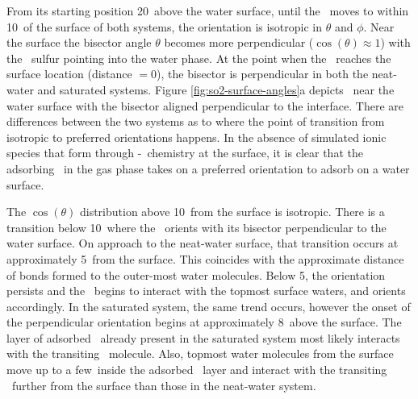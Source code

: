 	From its starting position 20\angs~above the water surface, until the \suldiox~moves to within 10\angs~of the surface of both systems, the orientation is isotropic in $\theta$ and $\phi$. Near the surface the bisector angle $\theta$ becomes more perpendicular ($\cos(\theta)\approx1$) with the \suldiox~sulfur pointing into the water phase. At the point when the \suldiox~reaches the surface location (distance $=0$\angs), the bisector is perpendicular in both the neat-water and saturated systems. Figure \ref{fig:so2-surface-angles}a depicts \suldiox~near the water surface with the bisector aligned perpendicular to the interface. There are differences between the two systems as to where the point of transition from isotropic to preferred orientations happens. In the absence of simulated ionic species that form through \suldiox-\wat~chemistry at the surface, it is clear that the adsorbing \suldiox~in the gas phase takes on a preferred orientation to adsorb on a water surface.
 
  The $\cos(\theta)$ distribution above 10\angs~from the surface is isotropic. There is a transition below 10\angs~where the \suldiox~orients with its bisector perpendicular to the water surface. On approach to the neat-water surface, that transition occurs at approximately 5\angs~from the surface. This coincides with the approximate distance of bonds formed to the outer-most water molecules. Below 5\angs, the orientation persists and the \suldiox~begins to interact with the topmost surface waters, and orients accordingly. In the saturated system, the same trend occurs, however the onset of the perpendicular orientation begins at approximately 8\angs~above the surface. The layer of adsorbed \suldiox~already present in the saturated system most likely interacts with the transiting \suldiox~molecule. Also, topmost water molecules from the surface move up to a few\angs~inside the adsorbed \suldiox~layer and interact with the transiting \suldiox~further from the surface than those in the neat-water system.

